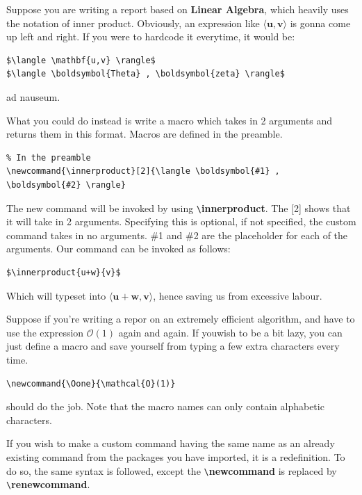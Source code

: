 \documentclass[12pt, letterpaper]{article}
\theoremstyle{remark}
\begin{document}
    Suppose you are writing a report based on \textbf{Linear Algebra}, which heavily uses the notation of inner product.
    Obviously, an expression like $\langle \mathbf{u,v} \rangle$ is gonna come up left and right.
    If you were to hardcode it everytime, it would be:

\begin{lstlisting}
$\langle \mathbf{u,v} \rangle$
$\langle \boldsymbol{Theta} , \boldsymbol{zeta} \rangle$
\end{lstlisting}
    ad nauseum.

    What you could do instead is write a macro which takes in 2 arguments and returns them in this format.
    Macros are defined in the preamble.
\begin{lstlisting}
% In the preamble
\newcommand{\innerproduct}[2]{\langle \boldsymbol{#1} , \boldsymbol{#2} \rangle}
\end{lstlisting}

    The new command will be invoked by using \verb!\!\textbf{innerproduct}. The [2] shows that it will take in 2 arguments.
    Specifying this is optional, if not specified, the custom command takes in no arguments.
    \#1 and \#2 are the placeholder for each of the arguments. Our command can be invoked as follows: 

\begin{lstlisting}
$\innerproduct{u+w}{v}$
\end{lstlisting}

    Which will typeset into $\langle \boldsymbol{u+w} , \boldsymbol{v} \rangle$, hence saving us from excessive labour.

    Suppose if you're writing a repor on an extremely efficient algorithm, and have to use the expression
    $\mathcal{O}(1)$ again and again. If youwish to be a bit lazy, you can just define a macro and save yourself from typing a few extra characters
    every time.
\begin{lstlisting}
\newcommand{\Oone}{\mathcal{O}(1)}
\end{lstlisting}
    
    should do the job. Note that the macro names can only contain alphabetic characters.

    If you wish to make a custom command having the same name as an already existing command
    from the packages you have imported, it is a redefinition. To do so, the same syntax is followed,
    except the \verb!\!\textbf{newcommand} is replaced by \verb!\!\textbf{renewcommand}.
\end{document}

